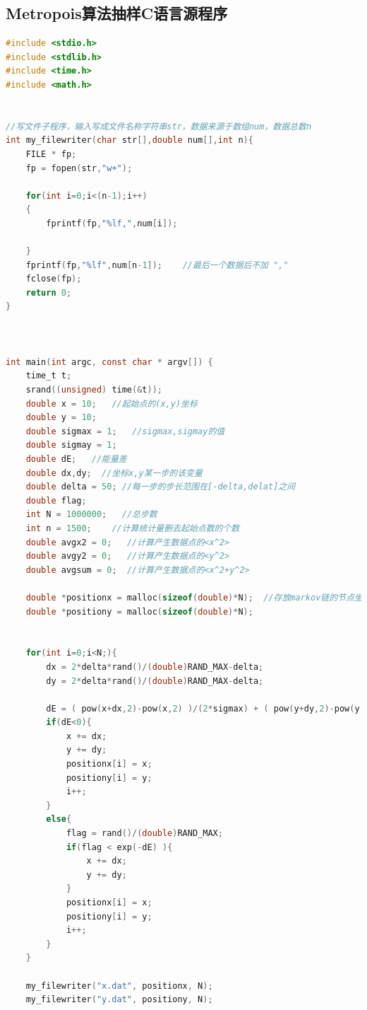 \documentclass[a4paper,11pt]{article}
\begin{document}
\begin{appendices}


\section{Metropois算法抽样C语言源程序}
\begin{lstlisting}[language = C]
#include <stdio.h>
#include <stdlib.h>
#include <time.h>
#include <math.h>


//写文件子程序，输入写成文件名称字符串str，数据来源于数组num，数据总数n
int my_filewriter(char str[],double num[],int n){
    FILE * fp;
    fp = fopen(str,"w+");

    for(int i=0;i<(n-1);i++)
    {
        fprintf(fp,"%lf,",num[i]);

    }
    fprintf(fp,"%lf",num[n-1]);    //最后一个数据后不加 ","
    fclose(fp);
    return 0;
}



int main(int argc, const char * argv[]) {
    time_t t;
    srand((unsigned) time(&t));
    double x = 10;   //起始点的(x,y)坐标
    double y = 10;
    double sigmax = 1;   //sigmax,sigmay的值
    double sigmay = 1;
    double dE;   //能量差
    double dx,dy;  //坐标x,y某一步的该变量
    double delta = 50; //每一步的步长范围在[-delta,delat]之间
    double flag;
    int N = 1000000;   //总步数
    int n = 1500;    //计算统计量删去起始点数的个数
    double avgx2 = 0;   //计算产生数据点的<x^2>
    double avgy2 = 0;   //计算产生数据点的<y^2>
    double avgsum = 0;  //计算产生数据点的<x^2+y^2>
    
    double *positionx = malloc(sizeof(double)*N);  //存放markov链的节点坐标数组
    double *positiony = malloc(sizeof(double)*N);
    
    
    for(int i=0;i<N;){
        dx = 2*delta*rand()/(double)RAND_MAX-delta;
        dy = 2*delta*rand()/(double)RAND_MAX-delta;
           
        dE = ( pow(x+dx,2)-pow(x,2) )/(2*sigmax) + ( pow(y+dy,2)-pow(y,2) )/(2*sigmay);
        if(dE<0){
            x += dx;
            y += dy;
            positionx[i] = x;
            positiony[i] = y;
            i++;
        }
        else{
            flag = rand()/(double)RAND_MAX;
            if(flag < exp(-dE) ){
                x += dx;
                y += dy;
            }
            positionx[i] = x;
            positiony[i] = y;
            i++;
        }
    }
    
    my_filewriter("x.dat", positionx, N);
    my_filewriter("y.dat", positiony, N);
      

\end{lstlisting}
\end{appendices}
\end{document}
